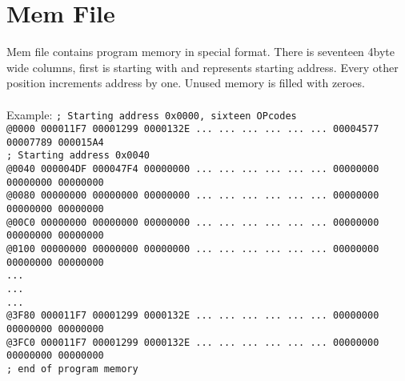         \section{Mem File}
            Mem file contains program memory in special format. There is seventeen 4byte wide columns, first is starting with \@ and represents starting address.
            Every other position increments address by one. Unused memory is filled with zeroes.\\\\
            Example:
            {
                \usecodefont
                \verb'; Starting address 0x0000, sixteen OPcodes'\\
                \verb'@0000 000011F7 00001299 0000132E ... ... ... ... ... ... 00004577 00007789 000015A4'\\
                \verb'; Starting address 0x0040'\\
                \verb'@0040 000004DF 000047F4 00000000 ... ... ... ... ... ... 00000000 00000000 00000000'\\
                \verb'@0080 00000000 00000000 00000000 ... ... ... ... ... ... 00000000 00000000 00000000'\\
                \verb'@00C0 00000000 00000000 00000000 ... ... ... ... ... ... 00000000 00000000 00000000'\\
                \verb'@0100 00000000 00000000 00000000 ... ... ... ... ... ... 00000000 00000000 00000000'\\
                \verb'...'\\
                \verb'...'\\
                \verb'...'\\
                \verb'@3F80 000011F7 00001299 0000132E ... ... ... ... ... ... 00000000 00000000 00000000'\\
                \verb'@3FC0 000011F7 00001299 0000132E ... ... ... ... ... ... 00000000 00000000 00000000'\\
                \verb'; end of program memory'\\
            }

